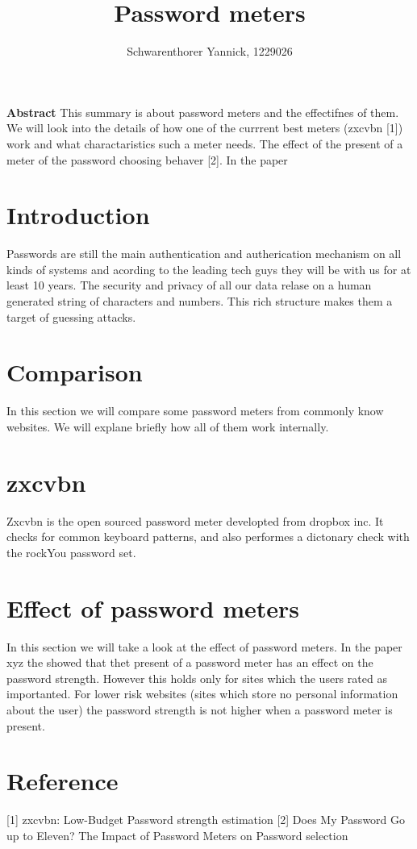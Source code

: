 \documentclass[12pt,a4paper]{article}
\author{Schwarenthorer Yannick, 1229026}
\title{Password meters}
\begin{document}
\maketitle

\textbf{Abstract} 
This summary is about password meters and the effectifnes of them. 
We will look into the details of how one of the currrent best meters (zxcvbn [1]) work and what charactaristics such a meter needs. The effect of the present of a meter of the password choosing behaver [2]. In the paper 


\tableofcontents 


\section{Introduction}
\label{sec:introduction}
Passwords are still the main authentication and autherication mechanism on all kinds of systems and acording to the leading tech guys they will be with us for at least 10 years.
The security and privacy of all our data relase on a human generated string of characters and numbers.
This rich structure makes them a target of guessing attacks.



\section{Comparison}
\label{sec:Comparison}
In this section we will compare some password meters from commonly know websites. We will explane briefly how all of them work internally.



\section{zxcvbn}
\label{sec:zxcvbn}
Zxcvbn is the open sourced password meter developted from dropbox inc. It checks for common keyboard patterns, and also performes a dictonary check with the rockYou password set.



\section{Effect of password meters}
\label{sec:effect}
In this section we will take a look at the effect of password meters.
In the paper xyz the showed that thet present of a password meter has an effect on the password strength. However this holds only for sites which the users rated as importanted. For lower risk websites (sites which store no personal information about the user) the password strength is not higher when a password meter is present.



\section{Reference}
\label{sec:referemce}

[1] zxcvbn: Low-Budget Password strength estimation
[2] Does My Password Go up to Eleven? The Impact of Password Meters on Password selection
\end{document}
